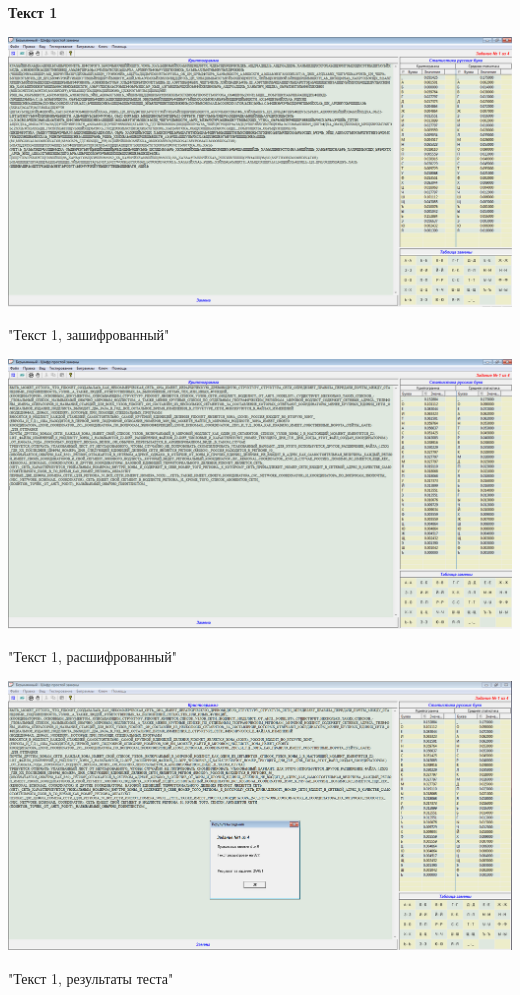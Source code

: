 \documentclass[a4paper,14pt]{extarticle}
\begin{document}
    \begin{center}
        \textbf{Текст 1}
    \end{center}

    \begin{center}
        \includegraphics[scale=0.3]{pics/1.png}

        "Текст 1, зашифрованный"
    \end{center}
    \begin{center}
        \includegraphics[scale=0.3]{pics/1_1.png}

        "Текст 1, расшифрованный"
    \end{center}
    \begin{center}
        \includegraphics[scale=0.3]{pics/1_2.png}

        "Текст 1, результаты теста"
    \end{center}
\end{document}
